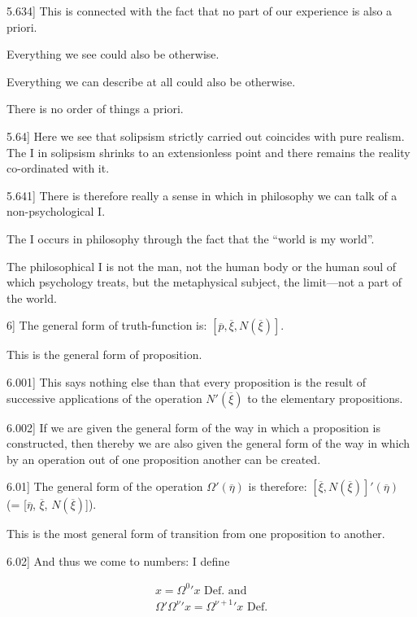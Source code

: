 \documentclass[12pt,oneside]{book}[2007/10/19]
\newcommand{\PropositionE}[2]{%
  \item[\phantomsection\label{PropE:#1}\PropGRef{#1}] #2%
}
\newcommand{\PropGRef}[1]{\hyperref[PropG:#1]{#1}}
\begin{document}
\begin{propositions}
\PropositionE{5.634}
{This is connected with the fact that no part of
our experience is also a priori.

Everything we see could also be otherwise.

Everything we can describe at all could also be
otherwise.

There is no order of things a priori.}


\PropositionE{5.64}
{Here we see that solipsism strictly carried out
coincides with pure realism. The I in solipsism
shrinks to an extensionless point and there remains
the reality co-ordinated with it.}


\PropositionE{5.641}
{There is therefore really a sense in which in
philosophy we can talk of a non-psy\-cho\-log\-i\-cal I.

The I occurs in philosophy through the fact
that the ``world is my world''.

The philosophical I is not the man, not the
human body or the human soul of which psychology
treats, but the metaphysical subject, the
limit---not a part of the world.}


\PropositionE{6}
{The general form of truth-function is:
$[\overline{p}, \overline{\xi}, N(\overline{\xi})]$.

This is the general form of proposition.}


\PropositionE{6.001}
{This says nothing else than that every proposition
is the result of successive applications
of the operation $N'(\overline{\xi})$ to the elementary propositions.}


\PropositionE{6.002}
{If we are given the general form of the way in
which a proposition is constructed, then thereby
we are also given the general form of the way in
which by an operation out of one proposition
another can be created.}


\PropositionE{6.01}
{The general form of the operation $\Omega'(\overline{\eta})$ is
therefore: $[\overline{\xi}, N(\overline{\xi})]'${}$(\overline{\eta})$ (= [$\overline{\eta}$, $\overline{\xi}$, $N(\overline{\xi})$]).

This is the most general form of transition from
one proposition to another.}


\PropositionE{6.02}
{And thus we come to numbers: I define}
\begin{gather*}
x = \Omega^{0}{}' x \text{ Def.\ and}\\
\Omega'\Omega^{\nu}{}'x = \Omega^{\nu+1}{}'x \text{ Def.}
\end{gather*}


\end{propositions}
\end{document}
